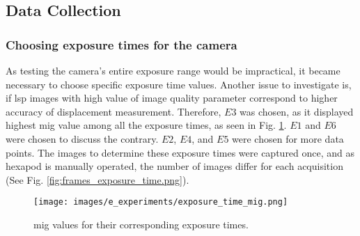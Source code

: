     
\subsection{Data Collection}\label{section:data_collection}
    \subsubsection*{Choosing exposure times for the camera}
        As testing the camera's entire exposure range would be impractical, it became necessary to choose specific exposure time values. Another issue to investigate is, if \gls{lsp} images with high value of image quality parameter correspond to higher accuracy of displacement measurement. Therefore, $E3$ was chosen, as it displayed highest \gls{mig} value among all the exposure times, as seen in Fig. \ref{fig:exposure_time_mig.png}. $E1$ and $E6$ were chosen to discuss the contrary. $E2$, $E4$, and $E5$ were chosen for more data points. The images to determine these exposure times were captured once, and as hexapod is manually operated, the number of images differ for each acquisition (See Fig. \ref{fig:frames_exposure_time.png}).

        \begin{figure}[ht]
            \centering
            \texttt{[image: images/e\_experiments/exposure\_time\_mig.png]}
            \caption{\gls{mig} values for their corresponding exposure times.}
            \label{fig:exposure_time_mig.png}
        \end{figure}

